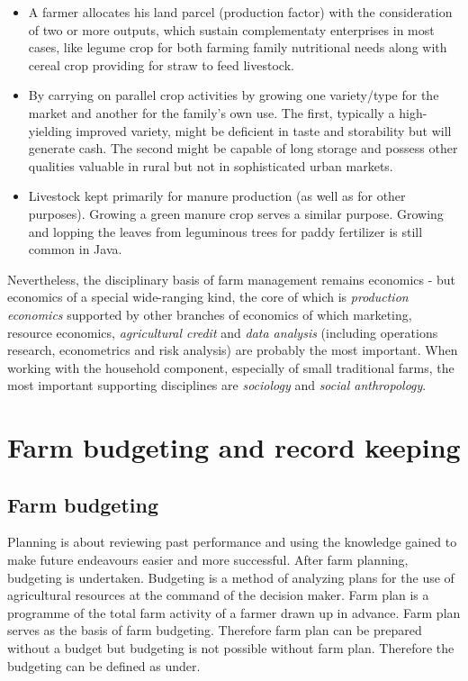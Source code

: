 \documentclass[11pt,]{book}
\providecommand{\tightlist}{%
  \setlength{\itemsep}{0pt}\setlength{\parskip}{0pt}}
\theoremstyle{definition}
\theoremstyle{definition}
\theoremstyle{definition}
\theoremstyle{remark}
\begin{document}
\begin{itemize}
\tightlist
\item
  A farmer allocates his land parcel (production factor) with the
  consideration of two or more outputs, which sustain complementaty
  enterprises in most cases, like legume crop for both farming family
  nutritional needs along with cereal crop providing for straw to feed
  livestock.
\item
  By carrying on parallel crop activities by growing one variety/type
  for the market and another for the family's own use. The first,
  typically a high-yielding improved variety, might be deficient in
  taste and storability but will generate cash. The second might be
  capable of long storage and possess other qualities valuable in rural
  but not in sophisticated urban markets.
\item
  Livestock kept primarily for manure production (as well as for other
  purposes). Growing a green manure crop serves a similar purpose.
  Growing and lopping the leaves from leguminous trees for paddy
  fertilizer is still common in Java.
\end{itemize}

Nevertheless, the disciplinary basis of farm management remains
economics - but economics of a special wide-ranging kind, the core of
which is \emph{production economics} supported by other branches of
economics of which marketing, resource economics, \emph{agricultural
credit} and \emph{data analysis} (including operations research,
econometrics and risk analysis) are probably the most important. When
working with the household component, especially of small traditional
farms, the most important supporting disciplines are \emph{sociology}
and \emph{social anthropology}.

\section{Farm budgeting and record
keeping}\label{farm-budgeting-and-record-keeping}

\subsection{Farm budgeting}\label{farm-budgeting}

Planning is about reviewing past performance and using the knowledge
gained to make future endeavours easier and more successful. After farm
planning, budgeting is undertaken. Budgeting is a method of analyzing
plans for the use of agricultural resources at the command of the
decision maker. Farm plan is a programme of the total farm activity of a
farmer drawn up in advance. Farm plan serves as the basis of farm
budgeting. Therefore farm plan can be prepared without a budget but
budgeting is not possible without farm plan. Therefore the budgeting can
be defined as under.
\end{document}
